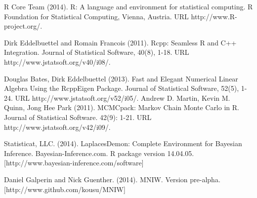 \documentclass[english]{report}
\begin{document}
\begin{thebibliography}{9}

R Core Team (2014). R: A language and environment for statistical computing. R Foundation for
  Statistical Computing, Vienna, Austria. URL http://www.R-project.org/.
  
 Dirk Eddelbuettel and Romain Francois (2011). Rcpp: Seamless R and C++ Integration. Journal of
  Statistical Software, 40(8), 1-18. URL http://www.jstatsoft.org/v40/i08/.

Douglas Bates, Dirk Eddelbuettel (2013). Fast and Elegant Numerical Linear Algebra Using the
  RcppEigen Package. Journal of Statistical Software, 52(5), 1-24. URL
  http://www.jstatsoft.org/v52/i05/.
Andrew D. Martin, Kevin M. Quinn, Jong Hee Park (2011). MCMCpack: Markov Chain Monte Carlo in R.
  Journal of Statistical Software. 42(9): 1-21. URL http://www.jstatsoft.org/v42/i09/. 
 
Statisticat, LLC. (2014). LaplacesDemon: Complete Environment for
  Bayesian Inference. Bayesian-Inference.com. R package version
  14.04.05. [http://www.bayesian-inference.com/software] 
 
Daniel Galperin and Nick Guenther. (2014). MNIW. Version pre-alpha. [http://www.github.com/kousu/MNIW]
 
 \end{thebibliography}
\end{document}
